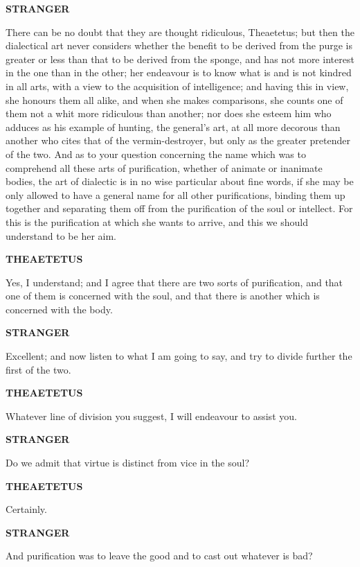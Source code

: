 \documentclass[11pt,letter]{article}
\begin{document}
\par \textbf{STRANGER}
\par   There can be no doubt that they are thought ridiculous, Theaetetus; but then the dialectical art never considers whether the benefit to be derived from the purge is greater or less than that to be derived from the sponge, and has not more interest in the one than in the other; her endeavour is to know what is and is not kindred in all arts, with a view to the acquisition of intelligence; and having this in view, she honours them all alike, and when she makes comparisons, she counts one of them not a whit more ridiculous than another; nor does she esteem him who adduces as his example of hunting, the general's art, at all more decorous than another who cites that of the vermin-destroyer, but only as the greater pretender of the two. And as to your question concerning the name which was to comprehend all these arts of purification, whether of animate or inanimate bodies, the art of dialectic is in no wise particular about fine words, if she may be only allowed to have a general name for all other purifications, binding them up together and separating them off from the purification of the soul or intellect. For this is the purification at which she wants to arrive, and this we should understand to be her aim.

\par \textbf{THEAETETUS}
\par   Yes, I understand; and I agree that there are two sorts of purification, and that one of them is concerned with the soul, and that there is another which is concerned with the body.

\par \textbf{STRANGER}
\par   Excellent; and now listen to what I am going to say, and try to divide further the first of the two.

\par \textbf{THEAETETUS}
\par   Whatever line of division you suggest, I will endeavour to assist you.

\par \textbf{STRANGER}
\par   Do we admit that virtue is distinct from vice in the soul?

\par \textbf{THEAETETUS}
\par   Certainly.

\par \textbf{STRANGER}
\par   And purification was to leave the good and to cast out whatever is bad?
\end{document}
